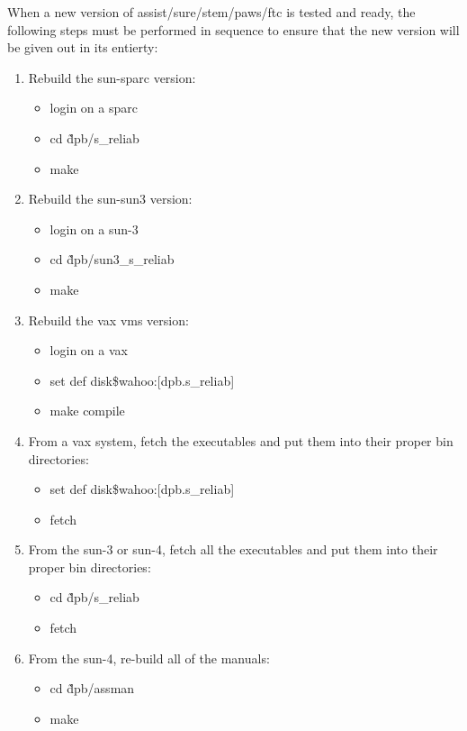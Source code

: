 When a new version of assist/sure/stem/paws/ftc is tested and ready, the
following steps must be performed in sequence to ensure that the new version
will be given out in its entierty:

\begin{enumerate}
   \item Rebuild the sun-sparc version:
      \begin{itemize}
      \item login on a sparc
      \item cd \~dpb/s\_reliab
      \item make
      \end{itemize}
   \item Rebuild the sun-sun3 version:
      \begin{itemize}
      \item login on a sun-3
      \item cd \~dpb/sun3\_s\_reliab
      \item make
      \end{itemize}
   \item Rebuild the vax vms version:
      \begin{itemize}
      \item login on a vax
      \item set def disk\$wahoo:[dpb.s\_reliab]
      \item {\atsign}make compile
      \end{itemize}
   \item From a vax system, fetch the executables and
          put them into their proper bin directories:
      \begin{itemize}
      \item set def disk\$wahoo:[dpb.s\_reliab]
      \item {\atsign}fetch
      \end{itemize}
   \item From the sun-3 or sun-4, fetch all the executables and
          put them into their proper bin directories:
      \begin{itemize}
      \item cd \~dpb/s\_reliab
      \item fetch
      \end{itemize}
   \item From the sun-4, re-build all of the manuals:
      \begin{itemize}
      \item cd \~dpb/assman
      \item make

\end{itemize}
\end{enumerate}
